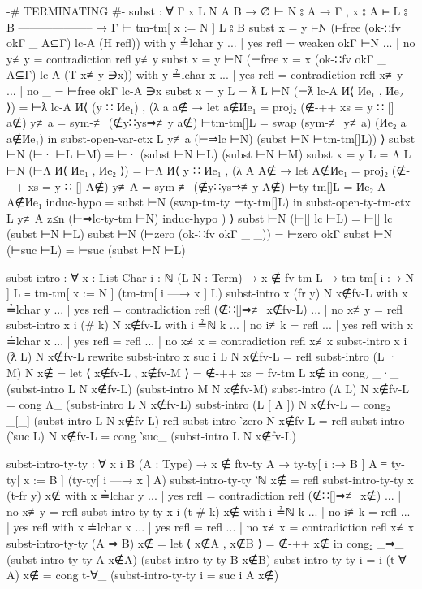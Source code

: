 \documentclass[logo,bsc,singlespacing,parskip,online]{infthesis}
\renewenvironment{code}{\mintedcopy[breaklines,breaksymbolleft=\;]{agda}}{\endmintedcopy}
\begin{document}
\begin{code}
  {-# TERMINATING #-}
  subst : ∀ {Γ x L N A B}
    → ∅ ⊢ N ⦂ A
    → Γ , x ⦂ A ⊢ L ⦂ B
      --------------------
    → Γ ⊢ tm-tm[ x := N ] L ⦂ B
  subst {x = y} ⊢N (⊢free (ok-∷fv okΓ _ A⊆Γ) lc-A (H refl)) with y ≟lchar y
  ... | yes refl = weaken okΓ ⊢N
  ... | no  y≢y  = contradiction refl y≢y
  subst {x = y} ⊢N (⊢free {x = x} (ok-∷fv okΓ _ A⊆Γ) lc-A (T x≢y ∋x)) with y ≟lchar x
  ... | yes refl = contradiction refl x≢y
  ... | no  _    = ⊢free okΓ lc-A ∋x
  subst {x = y} {L = ƛ L} ⊢N (⊢ƛ lc-A И⟨ Иe₁ , Иe₂ ⟩) =
    ⊢ƛ lc-A И⟨ (y ∷ Иe₁) , (λ a {a∉} →
      let a∉Иe₁ = proj₂ (∉-++ {xs = y ∷ []} a∉)
          y≢a = sym-≢ (∉y∷ys⇒≢y a∉)
          ⊢tm-tm[]L = swap (sym-≢ y≢a) (Иe₂ a {a∉Иe₁})
      in subst-open-var-ctx L y≢a (⊢⇒lc ⊢N) (subst ⊢N ⊢tm-tm[]L)) ⟩
  subst ⊢N (⊢· ⊢L ⊢M) = ⊢· (subst ⊢N ⊢L) (subst ⊢N ⊢M)
  subst {x = y} {L = Λ L} ⊢N (⊢Λ И⟨ Иe₁ , Иe₂ ⟩) =
    ⊢Λ И⟨ y ∷ Иe₁ , (λ A {A∉} →
      let A∉Иe₁ = proj₂ (∉-++ {xs = y ∷ []} A∉)
          y≢A = sym-≢ (∉y∷ys⇒≢y A∉)
          ⊢ty-tm[]L = Иe₂ A {A∉Иe₁}
          induc-hypo = subst ⊢N (swap-tm-ty ⊢ty-tm[]L)
      in subst-open-ty-tm-ctx L y≢A z≤n (⊢⇒lc-ty-tm ⊢N) induc-hypo ) ⟩
  subst ⊢N (⊢[] lc ⊢L) = ⊢[] lc (subst ⊢N ⊢L)
  subst ⊢N (⊢zero (ok-∷fv okΓ _ _)) = ⊢zero okΓ
  subst ⊢N (⊢suc ⊢L) = ⊢suc (subst ⊢N ⊢L)

  subst-intro : ∀ {x : List Char} {i : ℕ} (L N : Term)
    → x ∉ fv-tm L
    → tm-tm[ i :→ N ] L ≡ tm-tm[ x := N ] (tm-tm[ i —→ x ] L)
  subst-intro {x} (fr y) N x∉fv-L with x ≟lchar y
  ... | yes refl = contradiction refl (∉∷[]⇒≢ x∉fv-L)
  ... | no  x≢y  = refl
  subst-intro {x} {i} (# k) N x∉fv-L with i ≟ℕ k
  ... | no  i≢k = refl
  ... | yes refl with x ≟lchar x
  ...   | yes refl = refl
  ...   | no  x≢x  = contradiction refl x≢x
  subst-intro {x} {i} (ƛ L) N x∉fv-L
    rewrite subst-intro {x} {suc i} L N x∉fv-L = refl
  subst-intro (L · M) N x∉ = let ⟨ x∉fv-L , x∉fv-M ⟩ = ∉-++ {xs = fv-tm L} x∉
    in cong₂ _·_ (subst-intro L N x∉fv-L) (subst-intro M N x∉fv-M)
  subst-intro (Λ L) N x∉fv-L = cong Λ_ (subst-intro L N x∉fv-L)
  subst-intro (L [ A ]) N x∉fv-L = cong₂ _[_] (subst-intro L N x∉fv-L) refl
  subst-intro ‵zero N x∉fv-L = refl
  subst-intro (‵suc L) N x∉fv-L = cong ‵suc_ (subst-intro L N x∉fv-L)

  subst-intro-ty-ty : ∀ {x i B} (A : Type)
    → x ∉ ftv-ty A
    → ty-ty[ i :→ B ] A ≡ ty-ty[ x := B ] (ty-ty[ i —→ x ] A)
  subst-intro-ty-ty ‵ℕ x∉ = refl
  subst-intro-ty-ty {x} (t-fr y) x∉ with x ≟lchar y
  ... | yes refl = contradiction refl (∉∷[]⇒≢ x∉)
  ... | no  x≢y  = refl
  subst-intro-ty-ty {x} {i} (t-# k) x∉ with i ≟ℕ k
  ... | no  i≢k  = refl
  ... | yes refl with x ≟lchar x
  ...   | yes refl = refl
  ...   | no  x≢x  = contradiction refl x≢x
  subst-intro-ty-ty (A ⇒ B) x∉ = let ⟨ x∉A , x∉B ⟩ = ∉-++ x∉
    in cong₂ _⇒_ (subst-intro-ty-ty A x∉A) (subst-intro-ty-ty B x∉B)
  subst-intro-ty-ty {i = i} (t-∀ A) x∉ = cong t-∀_ (subst-intro-ty-ty {i = suc i} A x∉)


\end{code}
\end{document}
